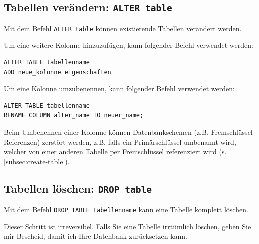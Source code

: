 \subsection{Tabellen verändern: \texorpdfstring{\lstinline[style=sql]|ALTER table|}{ALTER table}}
Mit dem Befehl \lstinline[style=sql]|ALTER table| können existierende Tabellen verändert werden.

\begin{myexample}
Um eine weitere Kolonne hinzuzufügen, kann folgender Befehl verwendet werden:
\begin{lstlisting}[style=sql]
ALTER TABLE tabellenname
ADD neue_kolonne eigenschaften
\end{lstlisting}
\end{myexample}

\begin{myexample}
Um eine Kolonne umzubenennen, kann folgender Befehl verwendet werden:
\begin{lstlisting}[style=sql]
ALTER TABLE tabellenname
RENAME COLUMN alter_name TO neuer_name;
\end{lstlisting}
\end{myexample}
\begin{mycaution}
Beim Umbenennen einer Kolonne können Datenbankschemen (z.B. Fremschlüssel-Referenzen) zerstört werden, z.B. falls ein Primärschlüssel umbenannt wird, welcher von einer anderen Tabelle per Fremschlüssel referenziert wird (s. \cref{subsec:create-table}).
\end{mycaution}

\subsection{Tabellen löschen: \texorpdfstring{\lstinline[style=sql]|DROP table|}{DROP table}}
Mit dem Befehl \lstinline[style=sql]|DROP TABLE tabellenname| kann eine Tabelle komplett löschen.

\begin{mycaution}
  Dieser Schritt ist irreversibel. Falls Sie eine Tabelle irrtümlich löschen, geben Sie mir Bescheid, damit ich Ihre Datenbank zurücksetzen kann.
\end{mycaution}

